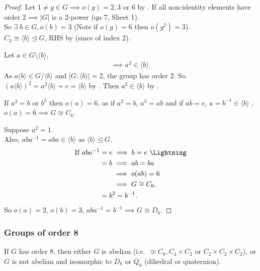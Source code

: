 \begin{proof}
  Let $1 \neq g \in G \implies o(g) = 2, 3 \text{ or } 6$ by .
  If all non-identity elements have order $2 \implies |G|$ is a $2$-power \Lightning (qn 7, Sheet 1). \\
  So $\exists \; b \in G, o(b) = 3$ (Note if $o(g) = 6$ then $o(g^2) = 3$). \\
  $C_3 \cong \langle b \rangle \trianglelefteq G$, RHS by  (since of index 2).

  Let $a \in G \setminus \langle b \rangle$,
  \begin{align*}
    \implies a^2 \in \langle b \rangle.
  \end{align*} 
  As $a \langle b \rangle \in G / \langle b \rangle$ and $|G : \langle b \rangle| = 2$, the group has order $2$. 
  So $(a \langle b \rangle)^2 = a^2 \langle b \rangle = e = \langle b \rangle$ by .
  Then $a^2 \in \langle b \rangle$ by .

  If $a^2 = b$ or $b^2$ then $o(a) = 6$, as if $a^2 = b$, $a^3 = ab$ and if $ab = e$, $a = b^{-1} \in \langle b \rangle$ \Lightning. \\
  $o(a) = 6 \implies G \cong C_6$. 

  Suppose $a^2 = 1$.\\
  Also, $a b a^{-1} = aba \in \langle b \rangle$ as $\langle b \rangle \trianglelefteq G$.
  \begin{align*}
    \text{If } aba^{-1} &= e\implies b = e \text{ \Lightning} \\
    &= b \implies ab = ba \\
    &\hspace{3.3ex}\ \implies o(ab) = 6 \\
    &\hspace{3.3ex}\ \implies G \cong C_6. \\
    &= b^2 = b^{-1}.
  \end{align*} 
  So $o(a) = 2$, $o(b) = 3$, $aba^{-1} = b^{-1} \implies G \cong D_6$.
\end{proof} 

\subsubsection{Groups of order 8}

\begin{lemma}
  If $G$ has order 8, then either $G$ is abelian (i.e.\ $\cong C_8, C_4\times C_2$ or $C_2\times C_2\times C_2$), or $G$ is not abelian and isomorphic to $D_8$ or $Q_8$ (dihedral or quaternion).
\end{lemma}

